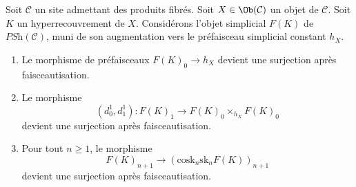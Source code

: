 \begin{lemma}
\label{lemma-hypercovering-F}
Soit $\mathcal{C}$ un site admettant des produits fibrés.
Soit $X \in \Ob(\mathcal{C})$ un objet de $\mathcal{C}$.
Soit $K$ un hyperrecouvrement de $X$.
Considérons l'objet simplicial $F(K)$ de $\textit{PSh}(\mathcal{C})$,
muni de son augmentation vers le préfaisceau simplicial constant $h_X$.
\begin{enumerate}
\item Le morphisme de préfaisceaux $F(K)_0 \to h_X$ devient
une surjection après faisceautisation.
\item Le morphisme
$$
(d^1_0, d^1_1) :
F(K)_1
\longrightarrow
F(K)_0 \times_{h_X} F(K)_0
$$
devient une surjection après faisceautisation.
\item Pour tout $n \geq 1$, le morphisme
$$
F(K)_{n + 1} \longrightarrow (\text{cosk}_n \text{sk}_n F(K))_{n + 1}
$$
devient une surjection après faisceautisation.
\end{enumerate}
\end{lemma}

